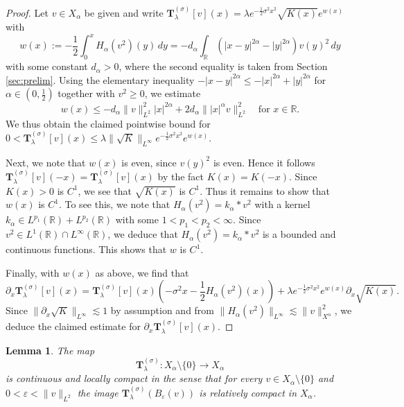 \documentclass[reqno,10pt,a4paper]{amsart}
\newtheorem{lem}{Lemma}[section]
\theoremstyle{definition}
\theoremstyle{definition}
\theoremstyle{remark}
\theoremstyle{remark}
\numberwithin{equation}{section}
\newcommand{\R}{\mathbb{R}}
\newcommand{\pt}{\partial}
\newcommand{\eps}{\varepsilon}
\newcommand{\Tss}{\mathbf{T}^{(\sigma)}_\lambda}
\begin{document}
\begin{proof}
Let $v \in X_\alpha$ be given and write $\Tss[v](x) = \lambda e^{-\frac{1}{2} \sigma^2 x^2} \sqrt{K(x)} e^{w(x)}$ with
$$
w(x) := -\frac{1}{2} \int_0^x H_\alpha(v^2)(y) \, dy = -d_\alpha \int_{\R} (|x-y|^{2 \alpha}- |y|^{2 \alpha}) v(y)^2 \, dy
$$
with some constant $d_\alpha > 0$, where the second equality is taken from Section \ref{sec:prelim}. Using the elementary inequality $-|x-y|^{2 \alpha} \leq -|x|^{2 \alpha} + |y|^{2 \alpha}$ for $\alpha \in (0, \frac{1}{2})$ together with $v^2 \geq 0$, we estimate
$$
w(x) \leq -d_\alpha \| v \|_{L^2}^2 |x|^{2 \alpha} + 2 d_\alpha \| |x|^{\alpha} v \|_{L^2}^2 \quad \mbox{for $x \in \R$}.
$$
We thus obtain the claimed pointwise bound for $0 < \Tss[v](x) \leq \lambda \| \sqrt{K} \|_{L^\infty} e^{-\frac{1}{2} \sigma^2 x^2} e^{w(x)}$.

Next, we note that $w(x)$ is even, since $v(y)^2$ is even. Hence it follows $\Tss[v](-x)=\Tss[v](x)$ by the fact $K(x)=K(-x)$. Since $K(x) > 0$ is $C^1$, we see that $\sqrt{K(x)}$ is $C^1$. Thus it remains to show that $w(x)$ is $C^1$. To see this, we note that $H_\alpha(v^2) = k_\alpha \ast v^2$ with a kernel $k_\alpha \in L^{p_1}(\R) + L^{p_2}(\R)$ with some $1 < p_1 < p_2 < \infty$. Since $v^2 \in L^1(\R) \cap L^\infty(\R)$, we deduce that $H_\alpha(v^2) = k_\alpha \ast v^2$ is a bounded and continuous functions. This shows that $w$ is $C^1$.

Finally, with $w(x)$ as above, we find that
$$
\pt_x \Tss[v](x) = \Tss[v](x) \left ( -\sigma^2 x - \frac{1}{2} H_\alpha(v^2)(x) \right ) + \lambda e^{-\frac{1}{2} \sigma^2 x^2} e^{w(x)} \pt_x \sqrt{K(x)}.
$$
Since $\| \pt_x \sqrt{K} \|_{L^\infty} \lesssim 1$ by assumption and from $\| H_\alpha(v^2) \|_{L^\infty} \lesssim \| v \|_{X^\alpha}^2$, we deduce the claimed estimate for $\pt_x \Tss[v](x)$.
\end{proof}

\begin{lem} \label{lem:Ts_compact}
The map
$$
\Tss : X_\alpha \setminus \{ 0 \} \to X_\alpha
$$
is continuous and locally compact in the sense that for every $v \in X_\alpha \setminus \{ 0 \}$ and $0 < \eps < \| v \|_{L^2}$ the image $\Tss(B_\eps(v))$ is relatively compact in $X_\alpha$.
\end{lem}
\end{document}
